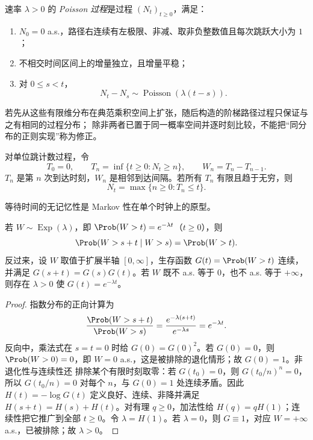 \begin{definition}[Poisson 过程]\label{def:6-3-3-1}
速率 $\lambda>0$ 的 \emph{Poisson 过程}是过程 $(N_t)_{t\geq0}$，满足：
\begin{enumerate}
 \item $N_0=0$ a.s.，路径右连续有左极限、非减、取非负整数值且每次跳跃大小为 $1$；
 \item 不相交时间区间上的增量独立，且增量平稳；
 \item 对 $0\leq s<t$，
 \[
   N_t-N_s\sim\operatorname{Poisson}(\lambda(t-s)).
 \]
\end{enumerate}
\end{definition}

若先从这些有限维分布在典范乘积空间上扩张，随后构造的阶梯路径过程只保证与之有相同的过程分布；
除非两者已置于同一概率空间并逐时刻比较，不能把“同分布的正则实现”称为修正。

\begin{definition}[到达时刻与等待时间]\label{def:6-3-3-2}
对单位跳计数过程，令
\[
 T_0=0,\qquad T_n=\inf\{t\geq0:N_t\geq n\},\qquad
 W_n=T_n-T_{n-1}.
\]
$T_n$ 是第 $n$ 次到达时刻，$W_n$ 是相邻到达间隔。若所有 $T_n$ 有限且趋于无穷，则
\[
 N_t=\max\{n\geq0:T_n\leq t\}.
\]
\end{definition}

等待时间的无记忆性是 Markov 性在单个时钟上的原型。

\begin{proposition}[指数分布的无记忆性]\label{proposition:6-3-3-1}
若 $W\sim\operatorname{Exp}(\lambda)$，即
$\Prob(W>t)=e^{-\lambda t}$（$t\geq0$），则
\[
 \Prob(W>s+t\mid W>s)=\Prob(W>t).
\]
反过来，设 $W$ 取值于扩展半轴 $[0,\infty]$，生存函数 $G(t)=\Prob(W>t)$ 连续，并满足
$G(s+t)=G(s)G(t)$。若 $W$ 既不 a.s. 等于 $0$，也不 a.s. 等于 $+\infty$，则存在
$\lambda>0$ 使 $G(t)=e^{-\lambda t}$。
\end{proposition}

\begin{proof}
指数分布的正向计算为
\[
 \frac{\Prob(W>s+t)}{\Prob(W>s)}
 =\frac{e^{-\lambda(s+t)}}{e^{-\lambda s}}=e^{-\lambda t}.
\]
反向中，乘法式在 $s=t=0$ 时给 $G(0)=G(0)^2$。若 $G(0)=0$，则
$\Prob(W>0)=0$，即 $W=0$ a.s.，这是被排除的退化情形；故 $G(0)=1$。非退化性与连续性还
排除某个有限时刻取零：若 $G(t_0)=0$，则
$G(t_0/n)^n=0$，所以 $G(t_0/n)=0$ 对每个 $n$，与 $G(0)=1$ 处连续矛盾。因此
$H(t)=-\log G(t)$ 定义良好、连续、非降并满足 $H(s+t)=H(s)+H(t)$。对有理
$q\geq0$，加法性给 $H(q)=qH(1)$；连续性把它推广到全部 $t\geq0$。令
$\lambda=H(1)$。若 $\lambda=0$，则 $G\equiv1$，对应 $W=+\infty$ a.s.，已被排除；故
$\lambda>0$。
\end{proof}

